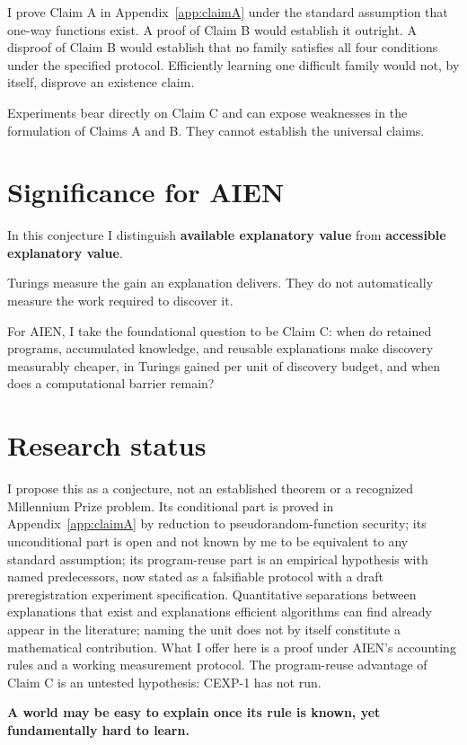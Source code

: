 \documentclass[11pt]{article}
\begin{document}
I prove Claim A in Appendix~\ref{app:claimA} under the standard assumption that one-way functions exist. A proof of Claim B would establish it outright. A disproof of Claim B would establish that no family satisfies all four conditions under the specified protocol. Efficiently learning one difficult family would not, by itself, disprove an existence claim.

Experiments bear directly on Claim C and can expose weaknesses in the formulation of Claims A and B. They cannot establish the universal claims.

\section*{Significance for AIEN}

In this conjecture I distinguish \textbf{available explanatory value} from \textbf{accessible explanatory value}.

Turings measure the gain an explanation delivers. They do not automatically measure the work required to discover it.

For AIEN, I take the foundational question to be Claim C: when do retained programs, accumulated knowledge, and reusable explanations make discovery measurably cheaper, in Turings gained per unit of discovery budget, and when does a computational barrier remain?

\section*{Research status}

I propose this as a conjecture, not an established theorem or a recognized Millennium Prize problem. Its conditional part is proved in Appendix~\ref{app:claimA} by reduction to pseudorandom-function security; its unconditional part is open and not known by me to be equivalent to any standard assumption; its program-reuse part is an empirical hypothesis with named predecessors, now stated as a falsifiable protocol with a draft preregistration experiment specification. Quantitative separations between explanations that exist and explanations efficient algorithms can find already appear in the literature; naming the unit does not by itself constitute a mathematical contribution. What I offer here is a proof under AIEN's accounting rules and a working measurement protocol. The program-reuse advantage of Claim C is an untested hypothesis: CEXP-1 has not run.

\begin{center}
\textbf{A world may be easy to explain once its rule is known, yet fundamentally hard to learn.}
\end{center}
\end{document}
